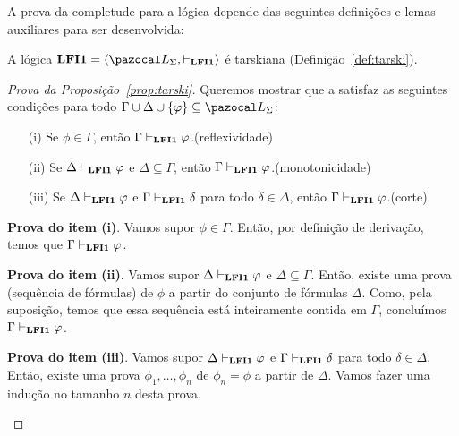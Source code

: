     A prova da completude para a lógica \lfium{} depende das seguintes definições e lemas auxiliares para ser desenvolvida:

    \begin{proposicao}\label{prop:tarski}        
        A lógica $\lfium{} = \langle \ling, \conhil \rangle$ é tarskiana (Definição~\ref{def:tarski}).
    \end{proposicao}

    \begin{proof}[Prova da Proposição~\ref{prop:tarski}]
        Queremos mostrar que a \lfium{} satisfaz as seguintes condições para todo $\Gamma \cup \Delta \cup \{\phi\} \subseteq \ling{}$:
        \begin{itemize}
            \item [(i)] Se $\phi \in \Gamma$, então $\Gamma \vdash_{{\normalfont\textbf{LFI1}}{}} \varphi$.\hfill(reflexividade)
            \item [(ii)] Se $\Delta \vdash_{{\normalfont\textbf{LFI1}}{}} \varphi$ e $\Delta \subseteq \Gamma$, então $\Gamma \vdash_{{\normalfont\textbf{LFI1}}{}} \varphi$.\hfill(monotonicidade)
            \item [(iii)] Se $\Delta \vdash_{{\normalfont\textbf{LFI1}}{}} \varphi$ e $\Gamma \vdash_{{\normalfont\textbf{LFI1}}{}} \delta$ para todo $\delta \in \Delta$, então $\Gamma \vdash_{{\normalfont\textbf{LFI1}}{}} \varphi$.\hfill(corte)
        \end{itemize}
        \begin{adjustwidth}{1cm}{}
            \textbf{Prova do item (i)}. Vamos supor $\phi \in \Gamma$. Então, por definição de derivação, temos que $\Gamma \vdash_{{\normalfont\textbf{LFI1}}{}} \varphi$.

            \noindent{}\textbf{Prova do item (ii)}. Vamos supor $\Delta \vdash_{{\normalfont\textbf{LFI1}}{}} \varphi$ e $\Delta \subseteq \Gamma$. Então, existe uma prova (sequência de fórmulas) de $\phi$ a partir do conjunto de fórmulas $\Delta$. Como, pela suposição, temos que essa sequência está inteiramente contida em $\Gamma$, concluímos $\Gamma \vdash_{{\normalfont\textbf{LFI1}}{}} \varphi$.
            
            \noindent{}\textbf{Prova do item (iii)}. Vamos supor $\Delta \vdash_{{\normalfont\textbf{LFI1}}{}} \varphi$ e $\Gamma \vdash_{{\normalfont\textbf{LFI1}}{}} \delta$ para todo $\delta \in \Delta$. Então, existe uma prova $\phi_1, \ldots, \phi_n$ de $\phi_n = \phi$ a partir de $\Delta$. Vamos fazer uma indução no tamanho $n$ desta prova.
            
            \begin{adjustwidth}{1cm}{}
                

\end{adjustwidth}
\end{adjustwidth}
\end{proof}
